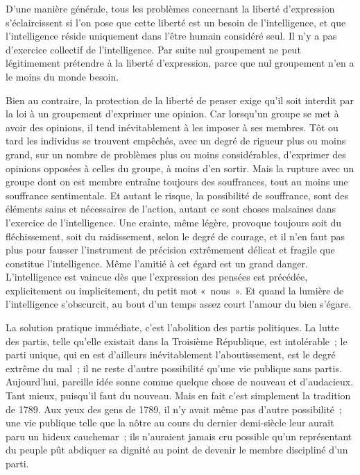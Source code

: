 \documentclass[french,twoside]{book} %
\begin{document}
D'une manière générale, tous les problèmes concernant la liberté d'expression s'éclaircissent si l'on pose que cette liberté est un besoin de l'intelligence, et que l'intelligence réside uniquement dans l'être humain considéré seul. Il n'y a pas d'exercice collectif de l'intelligence. Par suite nul groupement ne peut légitimement prétendre à la liberté d'expression, parce que nul groupement n'en a le moins du monde besoin.\par
Bien au contraire, la protection de la liberté de penser exige qu'il soit interdit par la loi à un groupement d'exprimer une opinion. Car lorsqu'un groupe se met à avoir des opinions, il tend inévitablement à les imposer à ses membres. Tôt ou tard les individus se trouvent empêchés, avec un degré de rigueur plus ou moins grand, sur un nombre de problèmes plus ou moins considérables, d'exprimer des opinions opposées à celles du groupe, à moins d'en sortir. Mais la rupture avec un groupe dont on est membre entraîne toujours des souffrances, tout au moins une souffrance sentimentale. Et autant le risque, la possibilité de souffrance, sont des éléments sains et nécessaires de l'action, autant ce sont choses malsaines dans l'exercice de l'intelligence. Une crainte, même légère, provoque toujours soit du fléchissement, soit du raidissement, selon le degré de courage, et il n'en faut pas plus pour fausser l'instrument de précision extrêmement délicat et fragile que constitue l'intelligence. Même l'amitié à cet égard est un grand danger. L'intelligence est vaincue dès que l'expression des pensées est précédée, explicitement ou implicitement, du petit mot « nous ». Et quand la lumière de l'intelligence s'obscurcit, au bout d'un temps assez court l'amour du bien s'égare.\par
La solution pratique immédiate, c'est l'abolition des partis politiques. La lutte des partis, telle qu'elle existait dans la Troisième République, est intolérable ; le parti unique, qui en est d'ailleurs inévitablement l'aboutissement, est le degré extrême du mal ; il ne reste d'autre possibilité qu'une vie publique sans partis. Aujourd'hui, pareille idée sonne comme quelque chose de nouveau et d'audacieux. Tant mieux, puisqu'il faut du nouveau. Mais en fait c'est simplement la tradition de 1789. Aux yeux des gens de 1789, il n'y avait même pas d'autre possibilité ; une vie publique telle que la nôtre au cours du dernier demi-siècle leur aurait paru un hideux cauchemar ; ils n'auraient jamais cru possible qu'un représentant du peuple pût abdiquer sa dignité au point de devenir le membre discipliné d'un parti.\par
\end{document}
